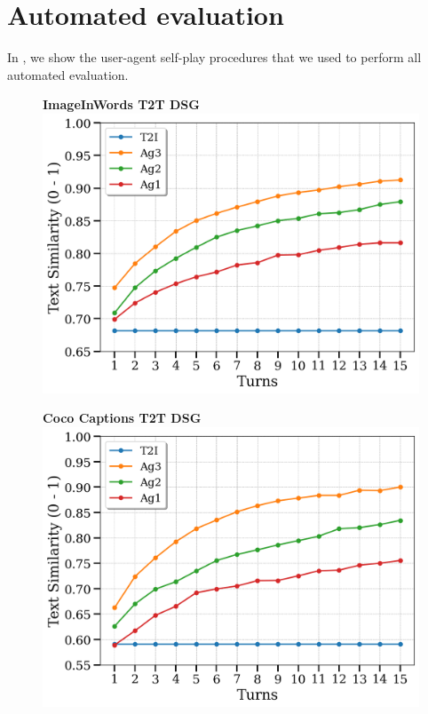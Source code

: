 \section{Automated evaluation}
In , we show the user-agent self-play procedures that we used to perform all automated evaluation.

\begin{figure}[h]
  \centering
  \begin{minipage}{0.49\textwidth}
    \centering
    \textbf{ImageInWords T2T DSG} 
    \includegraphics[width=\linewidth]{figures/imageinwords_dsgt2t.png}
  \end{minipage}
  \hfill
  \begin{minipage}{0.49\textwidth}
    \centering
    \textbf{Coco Captions T2T DSG} 
    \includegraphics[width=\linewidth]{figures/coco_captions_dsgt2t.png}

\end{minipage}
\end{figure}
